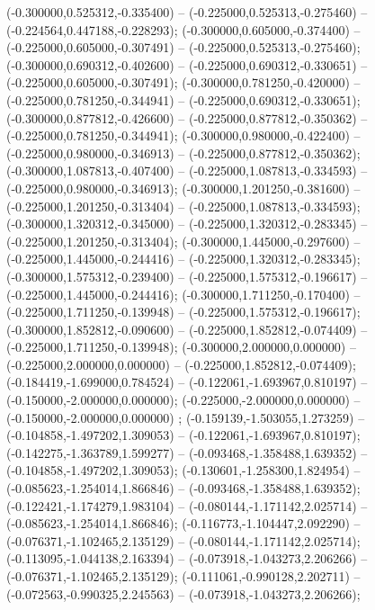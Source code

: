  (-0.300000,0.525312,-0.335400) -- (-0.225000,0.525313,-0.275460) -- (-0.224564,0.447188,-0.228293);
 (-0.300000,0.605000,-0.374400) -- (-0.225000,0.605000,-0.307491) -- (-0.225000,0.525313,-0.275460);
 (-0.300000,0.690312,-0.402600) -- (-0.225000,0.690312,-0.330651) -- (-0.225000,0.605000,-0.307491);
 (-0.300000,0.781250,-0.420000) -- (-0.225000,0.781250,-0.344941) -- (-0.225000,0.690312,-0.330651);
 (-0.300000,0.877812,-0.426600) -- (-0.225000,0.877812,-0.350362) -- (-0.225000,0.781250,-0.344941);
 (-0.300000,0.980000,-0.422400) -- (-0.225000,0.980000,-0.346913) -- (-0.225000,0.877812,-0.350362);
 (-0.300000,1.087813,-0.407400) -- (-0.225000,1.087813,-0.334593) -- (-0.225000,0.980000,-0.346913);
 (-0.300000,1.201250,-0.381600) -- (-0.225000,1.201250,-0.313404) -- (-0.225000,1.087813,-0.334593);
 (-0.300000,1.320312,-0.345000) -- (-0.225000,1.320312,-0.283345) -- (-0.225000,1.201250,-0.313404);
 (-0.300000,1.445000,-0.297600) -- (-0.225000,1.445000,-0.244416) -- (-0.225000,1.320312,-0.283345);
 (-0.300000,1.575312,-0.239400) -- (-0.225000,1.575312,-0.196617) -- (-0.225000,1.445000,-0.244416);
 (-0.300000,1.711250,-0.170400) -- (-0.225000,1.711250,-0.139948) -- (-0.225000,1.575312,-0.196617);
 (-0.300000,1.852812,-0.090600) -- (-0.225000,1.852812,-0.074409) -- (-0.225000,1.711250,-0.139948);
 (-0.300000,2.000000,0.000000) -- (-0.225000,2.000000,0.000000) -- (-0.225000,1.852812,-0.074409);
 (-0.184419,-1.699000,0.784524) -- (-0.122061,-1.693967,0.810197) -- (-0.150000,-2.000000,0.000000);
 (-0.225000,-2.000000,0.000000) -- (-0.150000,-2.000000,0.000000) ;
 (-0.159139,-1.503055,1.273259) -- (-0.104858,-1.497202,1.309053) -- (-0.122061,-1.693967,0.810197);
 (-0.142275,-1.363789,1.599277) -- (-0.093468,-1.358488,1.639352) -- (-0.104858,-1.497202,1.309053);
 (-0.130601,-1.258300,1.824954) -- (-0.085623,-1.254014,1.866846) -- (-0.093468,-1.358488,1.639352);
 (-0.122421,-1.174279,1.983104) -- (-0.080144,-1.171142,2.025714) -- (-0.085623,-1.254014,1.866846);
 (-0.116773,-1.104447,2.092290) -- (-0.076371,-1.102465,2.135129) -- (-0.080144,-1.171142,2.025714);
 (-0.113095,-1.044138,2.163394) -- (-0.073918,-1.043273,2.206266) -- (-0.076371,-1.102465,2.135129);
 (-0.111061,-0.990128,2.202711) -- (-0.072563,-0.990325,2.245563) -- (-0.073918,-1.043273,2.206266);
